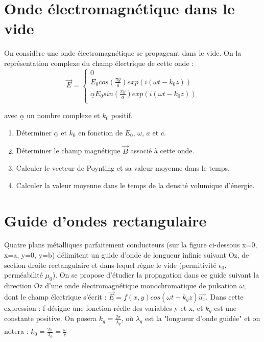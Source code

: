 \documentclass{article}
\begin{document}
\section{Onde électromagnétique dans le vide}

On considère une onde électromagnétique se propageant dans le vide. On la représentation complexe du champ électrique de cette onde : \\



\[
\vec{E} = \left\{
\begin{array}{l}
0 \\
E_0 cos(\frac{\pi y }{a}) exp(i(\omega t - k_0 z)) \\
\underline{\alpha} E_0 sin (\frac{\pi y}{a}) exp(i(\omega t - k_0 z)) \\
\end{array}
\right.
\]

avec $\underline{\alpha}$ un nombre complexe et $k_0$ positif. 

\begin{enumerate}
  \item Déterminer $\underline{\alpha}$ et $k_0$ en fonction de $E_0$, $\omega$, $a$ et $c$. 
  \item Déterminer le champ magnétique $\vec{B}$ associé à cette onde. 
  \item Calculer le vecteur de Poynting et sa valeur moyenne dans le temps. 
  \item Calculer la valeur moyenne dans le temps de la densité volumique d'énergie. 
\end{enumerate}

\section{Guide d'ondes rectangulaire}
Quatre plans métalliques parfaitement conducteurs (sur la figure ci-dessous x=0, x=a, y=0,
y=b) délimitent un guide d’onde de longueur infinie suivant Oz, de section droite rectangulaire et dans lequel règne le vide (permitivité $\epsilon_0$, perméabilité $\mu_0$).
On se propose d’étudier la propagation dans ce guide suivant la direction Oz d’une onde
électromagnétique monochromatique de pulsation $\omega$, dont le champ électrique s’écrit :
$\vec{E}=f(x,y)cos(\omega t-k_g z)\vec{u_x}$. Dans cette expression : f désigne une fonction réelle des 
variables y et x, et $ k_g$ est une constante positive. On posera $k_g=\frac{2\pi}{\lambda_g}$, où $\lambda_g$ est  la  "longueur d’onde
guidée" et on notera : $k_0 = \frac{2\pi}{\lambda_0}=\frac{\omega}{c}$
\end{document}
